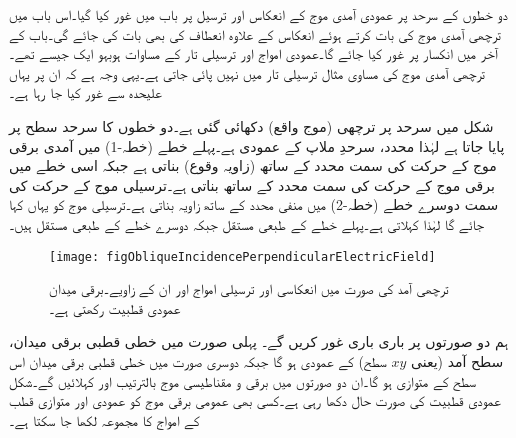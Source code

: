 دو خطوں کے سرحد پر عمودی آمدی موج کے انعکاس اور ترسیل پر باب  میں غور کیا گیا۔اس باب میں ترچھی آمدی موج کی بات کرتے ہوئے انعکاس کے علاوہ انعطاف کی بھی بات کی جائے گی۔باب کے آخر میں انکسار پر غور کیا جائے گا۔عمودی امواج اور ترسیلی تار کے مساوات ہوبہو ایک جیسے تھے۔ ترچھی آمدی موج کی مساوی مثال ترسیلی تار میں نہیں پائی جاتی ہے۔یہی وجہ ہے کہ ان پر یہاں علیحدہ  سے غور کیا جا رہا ہے۔

شکل  میں سرحد پر ترچھی  (موج واقع) دکھائی گئی ہے۔دو خطوں کا سرحد  سطح پر پایا جاتا ہے لہٰذا  محدد، سرحدِ ملاپ کے عمودی ہے۔پہلے خطے (خطہ-1) میں آمدی برقی موج کے حرکت کی سمت  محدد کے ساتھ   (زاویہ وقوع) بناتی ہے جبکہ اسی خطے میں  برقی موج کے حرکت کی سمت   محدد کے ساتھ   بناتی ہے۔ترسیلی موج کے حرکت کی سمت  دوسرے خطے (خطہ-2) میں منفی  محدد کے ساتھ  زاویہ بناتی ہے۔ترسیلی موج کو یہاں  کہا جائے گا لہٰذا   کہلاتی ہے۔پہلے خطے کے طبعی مستقل  جبکہ دوسرے خطے کے طبعی مستقل  ہیں۔
\begin{figure}
\centering
\texttt{[image: figObliqueIncidencePerpendicularElectricField]}
\caption{ترچھی آمد کی صورت میں انعکاسی اور ترسیلی امواج اور ان کے زاویے۔برقی میدان عمودی قطبیت رکھتی ہے۔}
\label{شکل_ترچھی_آمد_متوازی_برقی_میدان_عمومی_شکل}
\end{figure}

ہم دو صورتوں پر باری باری غور کریں گے۔ پہلی صورت میں خطی قطبی برقی میدان، سطح آمد (یعنی $xy$ سطح) کے  عمودی ہو گا جبکہ دوسری صورت میں خطی قطبی برقی میدان اس سطح کے متوازی ہو گا۔ان دو صورتوں میں برقی و مقناطیسی موج بالترتیب  اور  کہلائیں گے۔شکل  عمودی قطبیت کی صورت حال دکھا رہی ہے۔کسی بھی عمومی برقی موج کو عمودی اور متوازی قطب کے امواج کا مجموعہ لکھا جا سکتا ہے۔

